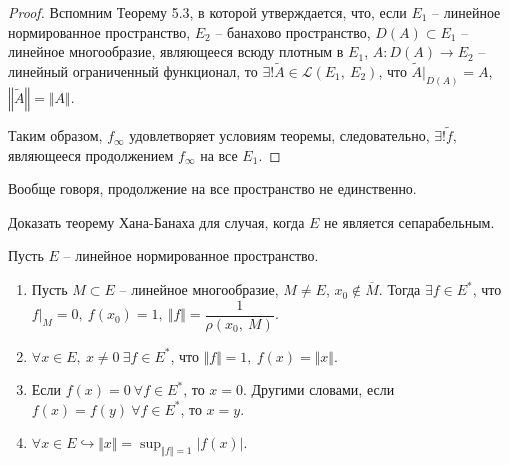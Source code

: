 \begin{proof}
    Вспомним Теорему 5.3, в которой утверждается, что, если $\displaystyle E_{1}$ -- линейное нормированное пространство, $\displaystyle E_{2}$ -- банахово пространство, $\displaystyle D( A) \subset E_{1}$ -- линейное многообразие, являющееся всюду плотным в $\displaystyle E_{1}$, $\displaystyle A:D( A)\rightarrow E_{2}$ -- линейный ограниченный функционал, то $\displaystyle \exists !\tilde{A} \in \mathcal{L}( E_{1} ,\ E_{2})$, что $\displaystyle \tilde{A} |_{D( A)} =A$, $\displaystyle \left\Vert \tilde{A}\right\Vert =\Vert A\Vert $.
    
    Таким образом, $\displaystyle f_{\infty }$ удовлетворяет условиям теоремы, следовательно, $\displaystyle \exists !\tilde{f}$, являющееся продолжением $\displaystyle f_{\infty }$ на все $\displaystyle E_{1}$.
    \end{proof}
    \begin{note}
    Вообще говоря, продолжение на все пространство не единственно.
    \end{note}
    \begin{exercise}
    Доказать теорему Хана-Банаха для случая, когда $\displaystyle E$ не является сепарабельным.
    \end{exercise}
    \begin{corollary}
    Пусть $\displaystyle E$ -- линейное нормированное пространство.
    \begin{enumerate}
        \item Пусть $\displaystyle M\subset E$ -- линейное многообразие, $\displaystyle M\neq E$, $\displaystyle x_{0} \notin \overline{M}$. Тогда $\displaystyle \exists f\in E^{*}$, что $\displaystyle f|_{M} =0,\ f( x_{0}) =1,\ \Vert f\Vert =\dfrac{1}{\rho ( x_{0} ,\ M)}$.
        \item $\displaystyle \forall x\in E,\ x\neq 0\ \exists f\in E^{*}$, что $\displaystyle \Vert f\Vert =1,\ f( x) =\Vert x\Vert $.
        \item Если $\displaystyle f( x) =0\ \forall f\in E^{*}$, то $\displaystyle x=0$. Другими словами, если $\displaystyle f( x) =f( y) \ \forall f\in E^{*}$, то $\displaystyle x=y$.
        \item $\displaystyle \forall x\in E\hookrightarrow \Vert x\Vert =\sup _{\Vert f\Vert =1}| f( x)| $.
    \end{enumerate}
    \end{corollary}
